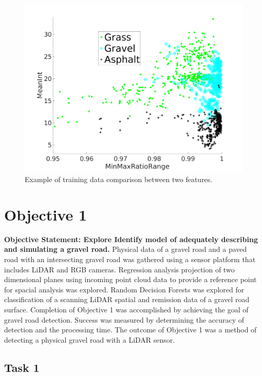 \documentclass[numbered,pdftex]{ohio-etd}
\begin{document}
{		
		
		\begin{figure}[H]
			\centering
			\includegraphics[width=0.7\linewidth]{Defense_Images/training_data_cluster}
			\caption[Example Clustering]{Example of training data comparison between two features.}
			\label{fig:training_data_cluster}
		\end{figure}
		

	\section{Objective 1}{
		
		{\textbf{Objective Statement: Explore Identify model of adequately describing and simulating a gravel road.} Physical data of a gravel road and a paved road with an intersecting gravel road was gathered using a sensor platform that includes LiDAR and RGB cameras. Regression analysis projection of two dimensional planes using incoming point cloud data to provide a reference point for spacial analysis was explored. Random Decision Forests was explored for classification of a scanning LiDAR spatial and remission data of a gravel road surface. Completion of Objective 1 was accomplished by achieving the goal of gravel road detection. Success was measured by determining the accuracy of detection and the processing time. The outcome of Objective 1 was a method of detecting a physical gravel road with a LiDAR sensor.}
	
		\subsection{Task 1}{
	
}}}
\end{document}
